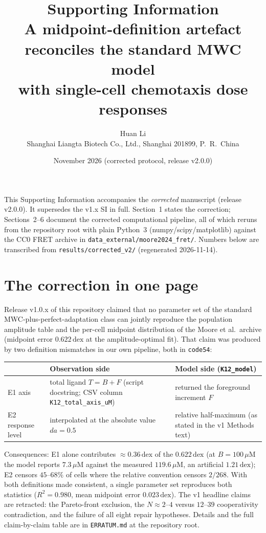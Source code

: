 \documentclass[11pt]{article}
\title{\bfseries Supporting Information\\[4pt]
\large A midpoint-definition artefact reconciles the standard MWC model\\
with single-cell chemotaxis dose responses}
\author{Huan Li\\ \small Shanghai Liangta Biotech Co., Ltd., Shanghai 201899, P.\ R.\ China}
\date{November 2026 (corrected protocol, release v2.0.0)}
\newcommand{\dex}{\ensuremath{\,\mathrm{dex}}}
\begin{document}
\maketitle

\noindent This Supporting Information accompanies the \emph{corrected} manuscript
(release v2.0.0). It supersedes the v1.x SI in full. Section~1 states the correction;
Sections~2--6 document the corrected computational pipeline, all of which reruns from the
repository root with plain Python~3 (numpy/scipy/matplotlib) against the CC0 FRET archive in
\texttt{data\_external/moore2024\_fret/}. Numbers below are transcribed from
\texttt{results/corrected\_v2/} (regenerated 2026-11-14).

\tableofcontents
\newpage

\section{The correction in one page}

Release v1.0.x of this repository claimed that no parameter set of the standard
MWC-plus-perfect-adaptation class can jointly reproduce the population amplitude table and the
per-cell midpoint distribution of the Moore et al.\ archive (midpoint error $0.622\dex$ at the
amplitude-optimal fit). That claim was produced by two definition mismatches in our own
pipeline, both in \texttt{code54}:

\begin{center}
\begin{tabular}{p{2.2cm} p{5.6cm} p{5.6cm}}
\toprule
 & Observation side & Model side (\texttt{K12\_model}) \\
\midrule
E1 axis & total ligand $T=B+F$ (script docstring; CSV column \texttt{K12\_total\_axis\_uM})
        & returned the foreground increment $F$ \\
E2 response level & interpolated at the absolute value $da=0.5$
        & relative half-maximum (as stated in the v1 Methods text) \\
\bottomrule
\end{tabular}
\end{center}

Consequences: E1 alone contributes $\approx$0.36\dex{} of the $0.622\dex$ (at $B=100\,\mu$M the
model reports $7.3\,\mu$M against the measured $119.6\,\mu$M, an artificial $1.21\dex$);
E2 censors $45$--$68\%$ of cells where the relative convention censors $2/268$. With both
definitions made consistent, a single parameter set reproduces both statistics
($R^2=0.980$, mean midpoint error $0.023\dex$). The v1 headline claims are retracted:
the Pareto-front exclusion, the $N\approx2$--$4$ versus $12$--$39$ cooperativity contradiction,
and the failure of all eight repair hypotheses. Details and the full claim-by-claim table are in
\texttt{ERRATUM.md} at the repository root.
\end{document}
